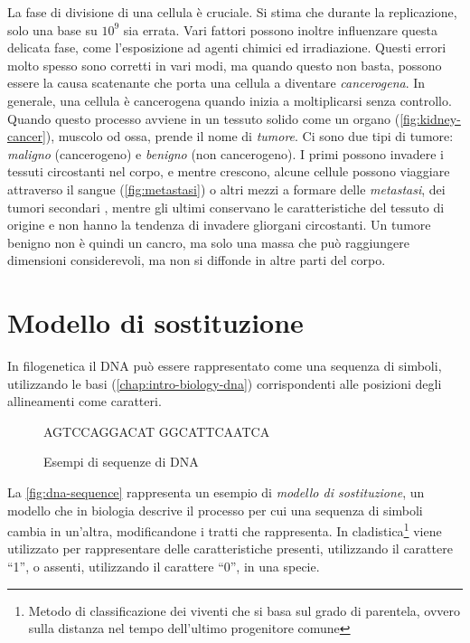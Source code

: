 La fase di divisione di una cellula è cruciale. Si stima che durante la replicazione, solo una base su $10^9$ \cite{DNAReplication} sia errata. Vari fattori possono inoltre influenzare questa delicata fase, come l'esposizione ad agenti chimici ed irradiazione. Questi errori molto spesso sono corretti in vari modi, ma quando questo non basta, possono essere la causa scatenante che porta una cellula a diventare \textit{cancerogena}. In generale, una cellula è cancerogena quando inizia a moltiplicarsi senza controllo. Quando questo processo avviene in un tessuto solido come un organo (\autoref{fig:kidney-cancer}), muscolo od ossa, prende il nome di \textit{tumore}. Ci sono due tipi di tumore: \textit{maligno} (cancerogeno) e \textit{benigno} (non cancerogeno). I primi possono invadere i tessuti circostanti nel corpo, e mentre crescono, alcune cellule possono viaggiare attraverso il sangue (\autoref{fig:metastasi}) o altri mezzi a formare delle \textit{metastasi}, dei tumori secondari \cite{differencecancertumor:online}, mentre gli ultimi conservano le caratteristiche del tessuto di origine e non hanno la tendenza di invadere gliorgani circostanti. Un tumore benigno non è quindi un cancro, ma solo una massa che può raggiungere dimensioni considerevoli, ma non si diffonde in altre parti del corpo.

\section{Modello di sostituzione}
\label{chap:intro-models}

In filogenetica il DNA può essere rappresentato come una sequenza di simboli, utilizzando le basi (\autoref{chap:intro-biology-dna}) corrispondenti alle posizioni degli allineamenti come caratteri.

\begin{figure}[h]
    \centering
    AGTCCAGGACAT \qquad GGCATTCAATCA
    \caption{Esempi di sequenze di DNA}
    \label{fig:dna-sequence}
\end{figure}

La \autoref{fig:dna-sequence} rappresenta un esempio di \textit{modello di sostituzione}, un modello che in biologia descrive il processo per cui una sequenza di simboli cambia in un'altra, modificandone i tratti che rappresenta. In cladistica\footnote{Metodo di classificazione dei viventi che si basa sul grado di parentela, ovvero sulla distanza nel tempo dell'ultimo progenitore comune} viene utilizzato per rappresentare delle caratteristiche presenti, utilizzando il carattere ``1'', o assenti, utilizzando il carattere ``0'', in una specie.

